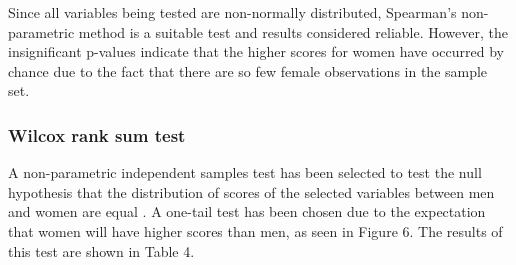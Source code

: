 Since all variables being tested are non-normally distributed, Spearman's non-parametric method is a suitable test and results considered reliable. However, the insignificant p-values indicate that the higher scores for women have occurred by chance due to the fact that there are so few female observations in the sample set.



\subsubsection{Wilcox rank sum test}


A non-parametric independent samples test has been selected to test the null hypothesis that the distribution of scores of the selected variables between men and women are equal \citep{Coolican2014}. A one-tail test has been chosen due to the expectation that women will have higher scores than men, as seen in Figure 6. The results of this test are shown in Table 4. 

